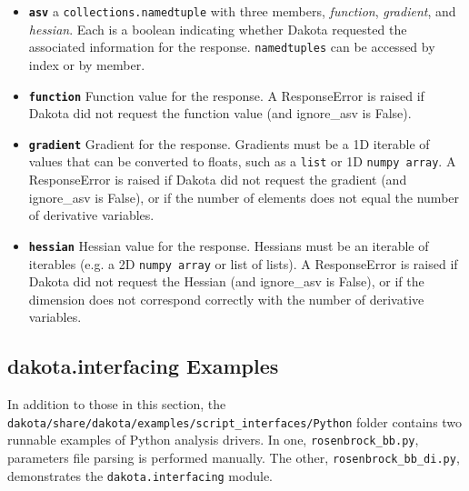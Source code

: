 \begin{itemize}
  \item {} \label{index:dakota.interfacing.Response.asv}\textbf{\texttt{asv}} a {\tt collections.namedtuple} with three members, \emph{function}, \emph{gradient}, and \emph{hessian}.
Each is a boolean indicating whether Dakota requested the
associated information for the response. {\tt namedtuples} can be
accessed by index or by member.

  \item {} \label{index:dakota.interfacing.Response.function}\textbf{\texttt{function}} Function value for the response. A ResponseError
is raised if Dakota did not request the function value (and
ignore\_asv is False).
  \item{} \label{index:dakota.interfacing.Response.gradient}\textbf{\texttt{gradient}} Gradient for the response. Gradients must be a 1D iterable of values that can be converted to floats, such as a {\tt list} or 1D {\tt numpy array}. A ResponseError is raised if Dakota did not request the gradient (and ignore\_asv is False), or if the number of elements does not equal the number of derivative variables.

  \item {} \label{index:dakota.interfacing.Response.hessian}\textbf{\texttt{hessian}} Hessian value for the response. Hessians must be an iterable of iterables (e.g. a 2D {\tt numpy array} or list of lists). A ResponseError is raised if Dakota did not request the Hessian (and ignore\_asv is False), or if the dimension does not correspond correctly with the number of derivative variables.

\end{itemize}

\subsection{dakota.interfacing Examples}

In addition to those in this section, the {\tt dakota/share/dakota/examples/script\_interfaces/Python} folder contains two runnable examples of Python analysis drivers. In one, {\tt rosenbrock\_bb.py}, parameters file parsing is performed manually. The other, {\tt rosenbrock\_bb\_di.py}, demonstrates the {\tt dakota.interfacing} module.

